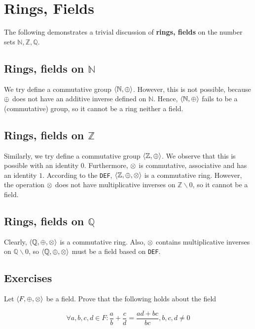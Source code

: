 \section{Rings, Fields}

\newcommand{\N}{\mathbb{N}}
\newcommand{\Z}{\mathbb{Z}}
\newcommand{\Q}{\mathbb{Q}}

The following demonstrates a trivial discussion of \textbf{rings, fields} on
the number sets \(\N, \Z, \Q\).

\subsection{Rings, fields on $\N$}

We try define a commutative group \(\la \N, \op \ra\). However, this is not
possible, because $\oplus$ does not have an additive inverse defined on $\N$.
Hence, \(\langle \N, \op \rangle\) fails to be a (commutative) group, so it
cannot be a ring neither a field.

\subsection{Rings, fields on $\Z$}

Similarly, we try define a commutative group \(\la \Z, \op \ra\). We observe
that this is possible with an identity $0$. Furthermore, $\otimes$ is commutative,
associative and has an identity $1$. According to the \verb|DEF|, \(\la \Z,
\op, \oo \ra\) is a commutative ring. However, the operation $\otimes$ does not 
have multiplicative inverses on \(\Z \backslash 0\), so it cannot be a field.

\subsection{Rings, fields on $\Q$}

Clearly, \(\la \Q, \op, \oo \ra\) is a commutative ring. Also, $\otimes$ contains
multiplicative inverses on \(\Q \backslash 0\), so \(\la \Q, \op, \oo \ra\)
must be a field based on \verb|DEF|.

\subsection{Exercises}

\exercise Let \(\langle F, \oplus, \otimes \rangle\) be a field. Prove that the
following holds about the field

\[
 \forall a,b,c,d \in F: \frac{a}{b} + \frac{c}{d} = \frac{ad + bc}{bc}, b, c, d
 \neq 0
\] %

